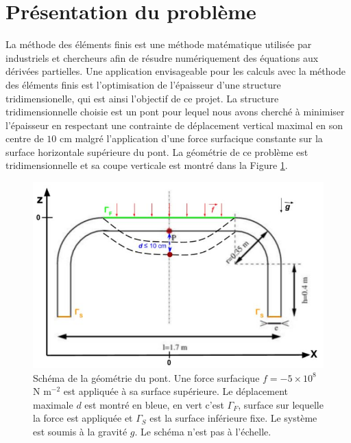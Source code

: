 \documentclass{article}
\begin{document}


    \section{Présentation du problème}
    La méthode des éléments finis est une méthode matématique utilisée par industriels et chercheurs afin de résudre numériquement des équations aux dérivées partielles. Une application envisageable pour les calculs avec la méthode des éléments finis est l'optimisation de l'épaisseur d'une structure tridimensionelle, 
    qui est ainsi l'objectif de ce projet. 
    La structure tridimensionnelle choisie est un pont pour lequel nous avons cherché à minimiser l'épaisseur
    en respectant une contrainte de déplacement vertical maximal en son centre de $10$ cm malgré l'application d'une force surfacique
    constante sur la surface horizontale supérieure du pont. 
    La géométrie de ce problème est tridimensionnelle et sa coupe verticale est montré dans la Figure \ref{fig:problem}.
    \begin{figure}[H]        
    \begin{center}
	
        \includegraphics[width=12cm]{imgs/coupe_2D-schema.JPG}
        \caption{Schéma de la géométrie du pont. Une force surfacique $f= - 5\times10^8$ N m$^{-2}$ est appliquée à sa surface supérieure. 
        Le déplacement maximale $d$ est montré en bleue, en vert c'est $\Gamma_F$, surface sur lequelle la force est appliquée et $\Gamma_S$ est la surface inférieure fixe. 
        Le système est soumis à la gravité $g$.
        Le schéma n'est pas à l'échelle.}
        \label{fig:problem}
    
	\end{center}
    \end{figure}
    
\end{document}
